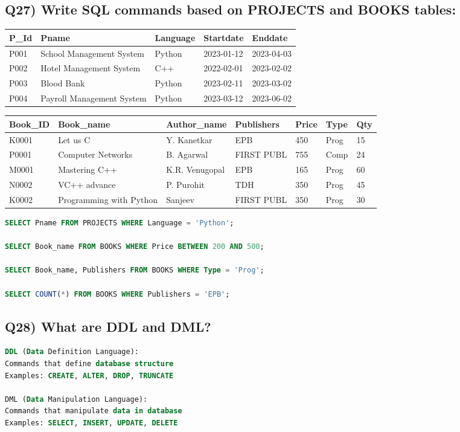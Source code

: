 \documentclass{article}
\begin{document}
\subsection*{Q27) Write SQL commands based on PROJECTS and BOOKS tables:}

\begin{tabular}{|l|l|l|l|l|}
\hline
P\_Id & Pname & Language & Startdate & Enddate \\
\hline
P001 & School Management System & Python & 2023-01-12 & 2023-04-03 \\
P002 & Hotel Management System & C++ & 2022-02-01 & 2023-02-02 \\
P003 & Blood Bank & Python & 2023-02-11 & 2023-03-02 \\
P004 & Payroll Management System & Python & 2023-03-12 & 2023-06-02 \\
\hline
\end{tabular}

\begin{tabular}{|l|l|l|l|l|l|l|}
\hline
Book\_ID & Book\_name & Author\_name & Publishers & Price & Type & Qty \\
\hline
K0001 & Let us C & Y. Kanetkar & EPB & 450 & Prog & 15 \\
P0001 & Computer Networks & B. Agarwal & FIRST PUBL & 755 & Comp & 24 \\
M0001 & Mastering C++ & K.R. Venugopal & EPB & 165 & Prog & 60 \\
N0002 & VC++ advance & P. Purohit & TDH & 350 & Prog & 45 \\
K0002 & Programming with Python & Sanjeev & FIRST PUBL & 350 & Prog & 30 \\
\hline
\end{tabular}

\begin{lstlisting}[language=SQL]
SELECT Pname FROM PROJECTS WHERE Language = 'Python';

SELECT Book_name FROM BOOKS WHERE Price BETWEEN 200 AND 500;

SELECT Book_name, Publishers FROM BOOKS WHERE Type = 'Prog';

SELECT COUNT(*) FROM BOOKS WHERE Publishers = 'EPB';
\end{lstlisting}

\subsection*{Q28) What are DDL and DML?}
\begin{lstlisting}[language=SQL]
DDL (Data Definition Language):
Commands that define database structure
Examples: CREATE, ALTER, DROP, TRUNCATE

DML (Data Manipulation Language):
Commands that manipulate data in database
Examples: SELECT, INSERT, UPDATE, DELETE
\end{lstlisting}
\end{document}
